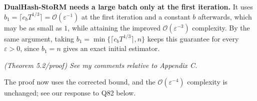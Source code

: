 \documentclass[11pt]{article}
\newcommand{\calO}{\mathcal{O}}
\newenvironment{bluequote}{\begin{quote}\normalfont\upshape\color{blue}}{\end{quote}}
\let\reviewitem\item
\newenvironment{qalist}{\begin{description}[leftmargin=0pt,labelindent=0pt,itemsep=0.8em,parsep=0.5em,font=\normalfont\upshape\bfseries]}{\end{description}}
\begin{document}
\begin{qalist}
\begin{enumerate}[label={[\roman*]},before=\let\item\reviewitem]
\begin{bluequote}
\end{bluequote}
\item \textbf{DualHash-StoRM needs a large batch only at the first iteration.} It uses $b_1=\lceil c_bT^{1/3}\rceil=\calO(\varepsilon^{-1})$ at the first iteration and a constant $b$ afterwards, which may be as small as $1$, while attaining the improved $\calO(\varepsilon^{-3})$ complexity. By the same argument, taking $b_1=\min\{\lceil c_bT^{1/3}\rceil,n\}$ keeps this guarantee for every $\varepsilon>0$, since $b_1=n$ gives an exact initial estimator.
\end{enumerate}

\item[{Q53.}] {\itshape (Theorem 5.2/proof) See my comments relative to Appendix C.}
\item[Response:] The proof now uses the corrected bound, and the $\calO(\varepsilon^{-4})$ complexity is unchanged; see our response to Q82 below.


\end{qalist}
\end{document}
